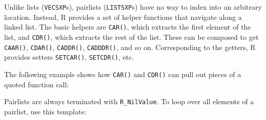 Unlike lists (\texttt{VECSXP}s), pairlists (\texttt{LISTSXP}s) have no
way to index into an arbitrary location. Instead, R provides a set of
helper functions that navigate along a linked list. The basic helpers
are \texttt{CAR()}, which extracts the first element of the list, and
\texttt{CDR()}, which extracts the rest of the list. These can be
composed to get \texttt{CAAR()}, \texttt{CDAR()}, \texttt{CADDR()},
\texttt{CADDDR()}, and so on. Corresponding to the getters, R provides
setters \texttt{SETCAR()}, \texttt{SETCDR()}, etc.

The following example shows how \texttt{CAR()} and \texttt{CDR()} can
pull out pieces of a quoted function call:

\begin{Shaded}
\begin{Highlighting}[]
\StringTok{ }\NormalTok{(}\NormalTok{(} \NormalTok{), }\NormalTok{)}
\StringTok{ }\NormalTok{(}\NormalTok{(} \NormalTok{), }\NormalTok{)}
\StringTok{ }\NormalTok{(}\NormalTok{(} \NormalTok{), }\NormalTok{)}

\StringTok{ }\NormalTok{(}\NormalTok{(} \NormalTok{, } \NormalTok{))}
\CommentTok{#> }
\NormalTok{(}
\end{Highlighting}
\end{Shaded}

Pairlists are always terminated with \texttt{R\_NilValue}. To loop over
all elements of a pairlist, use this template:

\begin{Shaded}
\begin{Highlighting}[]
\StringTok{ }\NormalTok{(}\NormalTok{(} \NormalTok{), }

\StringTok{  \}}
\NormalTok{)}
\NormalTok{(}\NormalTok{(}
\NormalTok{(}\NormalTok{(}\NormalTok{()))}
\end{Highlighting}
\end{Shaded}

